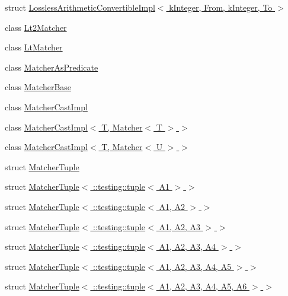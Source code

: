 \begin{DoxyCompactItemize}
\item 
struct \hyperlink{structtesting_1_1internal_1_1LosslessArithmeticConvertibleImpl_3_01kInteger_00_01From_00_01kInteger_00_01To_01_4}{Lossless\+Arithmetic\+Convertible\+Impl$<$ k\+Integer, From, k\+Integer, To $>$}
\item 
class \hyperlink{classtesting_1_1internal_1_1Lt2Matcher}{Lt2\+Matcher}
\item 
class \hyperlink{classtesting_1_1internal_1_1LtMatcher}{Lt\+Matcher}
\item 
class \hyperlink{classtesting_1_1internal_1_1MatcherAsPredicate}{Matcher\+As\+Predicate}
\item 
class \hyperlink{classtesting_1_1internal_1_1MatcherBase}{Matcher\+Base}
\item 
class \hyperlink{classtesting_1_1internal_1_1MatcherCastImpl}{Matcher\+Cast\+Impl}
\item 
class \hyperlink{classtesting_1_1internal_1_1MatcherCastImpl_3_01T_00_01Matcher_3_01T_01_4_01_4}{Matcher\+Cast\+Impl$<$ T, Matcher$<$ T $>$ $>$}
\item 
class \hyperlink{classtesting_1_1internal_1_1MatcherCastImpl_3_01T_00_01Matcher_3_01U_01_4_01_4}{Matcher\+Cast\+Impl$<$ T, Matcher$<$ U $>$ $>$}
\item 
struct \hyperlink{structtesting_1_1internal_1_1MatcherTuple}{Matcher\+Tuple}
\item 
struct \hyperlink{structtesting_1_1internal_1_1MatcherTuple_3_01_1_1testing_1_1tuple_3_01A1_01_4_01_4}{Matcher\+Tuple$<$ \+::testing\+::tuple$<$ A1 $>$ $>$}
\item 
struct \hyperlink{structtesting_1_1internal_1_1MatcherTuple_3_01_1_1testing_1_1tuple_3_01A1_00_01A2_01_4_01_4}{Matcher\+Tuple$<$ \+::testing\+::tuple$<$ A1, A2 $>$ $>$}
\item 
struct \hyperlink{structtesting_1_1internal_1_1MatcherTuple_3_01_1_1testing_1_1tuple_3_01A1_00_01A2_00_01A3_01_4_01_4}{Matcher\+Tuple$<$ \+::testing\+::tuple$<$ A1, A2, A3 $>$ $>$}
\item 
struct \hyperlink{structtesting_1_1internal_1_1MatcherTuple_3_01_1_1testing_1_1tuple_3_01A1_00_01A2_00_01A3_00_01A4_01_4_01_4}{Matcher\+Tuple$<$ \+::testing\+::tuple$<$ A1, A2, A3, A4 $>$ $>$}
\item 
struct \hyperlink{structtesting_1_1internal_1_1MatcherTuple_3_01_1_1testing_1_1tuple_3_01A1_00_01A2_00_01A3_00_01A4_00_01A5_01_4_01_4}{Matcher\+Tuple$<$ \+::testing\+::tuple$<$ A1, A2, A3, A4, A5 $>$ $>$}
\item 
struct \hyperlink{structtesting_1_1internal_1_1MatcherTuple_3_01_1_1testing_1_1tuple_3_01A1_00_01A2_00_01A3_00_01A4_00_01A5_00_01A6_01_4_01_4}{Matcher\+Tuple$<$ \+::testing\+::tuple$<$ A1, A2, A3, A4, A5, A6 $>$ $>$}

\end{DoxyCompactItemize}

